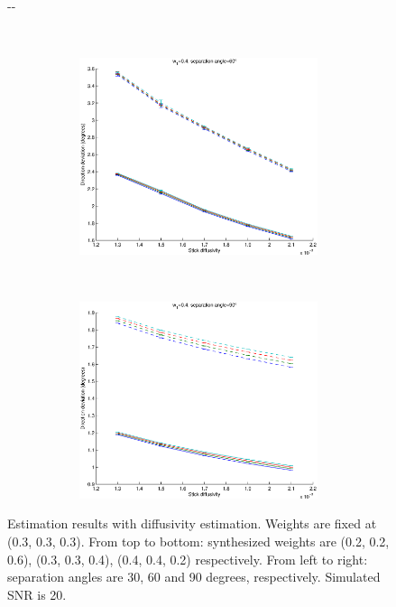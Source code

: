 \documentclass{article}
\begin{document}
\begin{figure}[H]
\begin{adjustwidth}{-\oddsidemargin}{-\rightmargin}
\begin{subfigure}{0.8\paperwidth}
\begin{subfigure}{0.3\textwidth}
      \end{subfigure}
      ~
      \begin{subfigure}{0.3\textwidth}
        \centering
        \includegraphics[width=\textwidth]{figures/synth_bas_diffus__snr=20__w1=4__angle=60.eps}
      \end{subfigure}
      ~
      \begin{subfigure}{0.3\textwidth}
        \centering
        \includegraphics[width=\textwidth]{figures/synth_bas_diffus__snr=20__w1=4__angle=90.eps}
      \end{subfigure}
    \end{subfigure}
  \end{adjustwidth}
  
  \caption{Estimation results with diffusivity estimation. Weights are fixed at (0.3, 0.3, 0.3). From top to bottom: synthesized weights are (0.2, 0.2, 0.6), (0.3, 0.3, 0.4), (0.4, 0.4, 0.2) respectively. From left to right: separation angles are 30, 60 and 90 degrees, respectively. Simulated SNR is 20.}
\end{figure}
\end{document}
